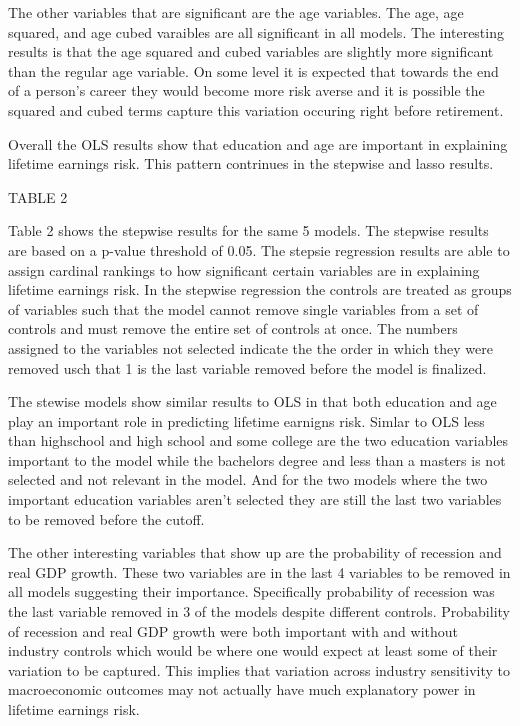 \documentclass[12pt]{article}
\begin{document}
\begin{onehalfspace}
The other variables that are significant are the age variables. The age, age squared, and age cubed varaibles are all significant in all models. The interesting results is that the age squared and cubed variables are slightly more significant than the regular age variable. On some level it is expected that towards the end of a person's career they would become more risk averse and it is possible the squared and cubed terms capture this variation occuring right before retirement. 

Overall the OLS results show that education and age are important in explaining lifetime earnings risk. This pattern contrinues in the stepwise and lasso results.



TABLE 2


Table 2 shows the stepwise results for the same 5 models. The stepwise results are based on a p-value threshold of 0.05. The stepsie regression results are able to assign cardinal rankings to how significant certain variables are in explaining lifetime earnings risk. In the stepwise regression the controls are treated as groups of variables such that the model cannot remove single variables from a set of controls and must remove the entire set of controls at once. The numbers assigned to the variables not selected indicate the the order in which they were removed usch that 1 is the last variable removed before the model is finalized.

The stewise models show similar results to OLS in that both education and age play an important role in predicting lifetime earnigns risk. Simlar to OLS less than highschool and high school and some college are the two education variables important to the model while the bachelors degree and less than a masters is not selected and not relevant in the model. And for the two models where the two important education variables aren't selected they are still the last two variables to be removed before the cutoff. 

The other interesting variables that show up are the probability of recession and real GDP growth. These two variables are in the last 4 variables to be removed in all models suggesting their importance. Specifically probability of recession was the last variable removed in 3 of the models despite different controls. Probability of recession and real GDP growth were both important with and without industry controls which would be where one would expect at least some of their variation to be captured. This implies that variation across industry sensitivity to macroeconomic outcomes may not actually have much explanatory power in lifetime earnings risk.


\end{onehalfspace}
\end{document}
